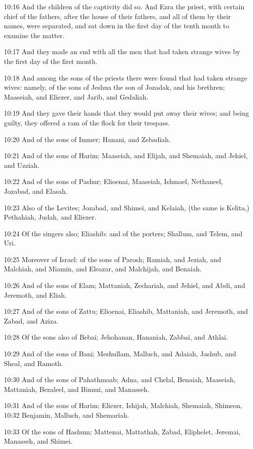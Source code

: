 10:16 And the children of the captivity did so. And Ezra the priest,
with certain chief of the fathers, after the house of their fathers,
and all of them by their names, were separated, and sat down in the
first day of the tenth month to examine the matter.

10:17 And they made an end with all the men that had taken strange
wives by the first day of the first month.

10:18 And among the sons of the priests there were found that had
taken strange wives: namely, of the sons of Jeshua the son of Jozadak,
and his brethren; Maaseiah, and Eliezer, and Jarib, and Gedaliah.

10:19 And they gave their hands that they would put away their wives;
and being guilty, they offered a ram of the flock for their trespass.

10:20 And of the sons of Immer; Hanani, and Zebadiah.

10:21 And of the sons of Harim; Maaseiah, and Elijah, and Shemaiah,
and Jehiel, and Uzziah.

10:22 And of the sons of Pashur; Elioenai, Maaseiah, Ishmael,
Nethaneel, Jozabad, and Elasah.

10:23 Also of the Levites; Jozabad, and Shimei, and Kelaiah, (the same
is Kelita,) Pethahiah, Judah, and Eliezer.

10:24 Of the singers also; Eliashib: and of the porters; Shallum, and
Telem, and Uri.

10:25 Moreover of Israel: of the sons of Parosh; Ramiah, and Jeziah,
and Malchiah, and Miamin, and Eleazar, and Malchijah, and Benaiah.

10:26 And of the sons of Elam; Mattaniah, Zechariah, and Jehiel, and
Abdi, and Jeremoth, and Eliah.

10:27 And of the sons of Zattu; Elioenai, Eliashib, Mattaniah, and
Jeremoth, and Zabad, and Aziza.

10:28 Of the sons also of Bebai; Jehohanan, Hananiah, Zabbai, and
Athlai.

10:29 And of the sons of Bani; Meshullam, Malluch, and Adaiah, Jashub,
and Sheal, and Ramoth.

10:30 And of the sons of Pahathmoab; Adna, and Chelal, Benaiah,
Maaseiah, Mattaniah, Bezaleel, and Binnui, and Manasseh.

10:31 And of the sons of Harim; Eliezer, Ishijah, Malchiah, Shemaiah,
Shimeon, 10:32 Benjamin, Malluch, and Shemariah.

10:33 Of the sons of Hashum; Mattenai, Mattathah, Zabad, Eliphelet,
Jeremai, Manasseh, and Shimei.

